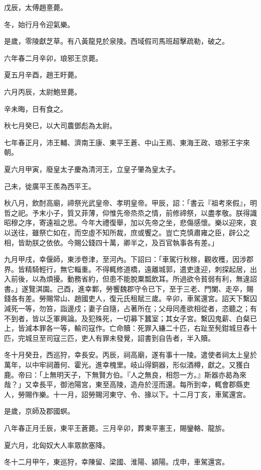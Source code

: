\begin{pinyinscope}
戊辰，太傅趙憙薨。

冬，始行月令迎氣樂。

是歲，零陵獻芝草。有八黃龍見於泉陵。西域假司馬班超擊疏勒，破之。

六年春二月辛卯，琅邪王京薨。

夏五月辛酉，趙王盱薨。

六月丙辰，太尉鮑昱薨。

辛未晦，日有食之。

秋七月癸巳，以大司農鄧彪為太尉。

七年春正月，沛王輔、濟南王康、東平王蒼、中山王焉、東海王政、琅邪王宇來朝。

夏六月甲寅，廢皇太子慶為清河王，立皇子肇為皇太子。

己未，徙廣平王羨為西平王。

秋八月，飲酎高廟，禘祭光武皇帝、孝明皇帝。甲辰，詔：「書云『祖考來假』，明哲之祀。予末小子，質又菲薄，仰惟先帝烝烝之情，前修禘祭，以盡孝敬。朕得識昭穆之序，寄遠祖之思。今年大禮復舉，加以先帝之坐，悲傷感懷。樂以迎來，哀以送往，雖祭亡如在，而空虛不知所裁，庶或饗之。豈亡克慎肅雍之臣，辟公之相，皆助朕之依依。今賜公錢四十萬，卿半之，及百官執事各有差。」

九月甲戌，幸偃師，東涉卷津，至河內。下詔曰：「車駕行秋稼，觀收穫，因涉郡界。皆精騎輕行，無它輜重。不得輒修道橋，遠離城郭，遣吏逢迎，刺探起居，出入前後，以為煩擾。動務省約，但患不能脫粟瓢飲耳。所過欲令貧弱有利，無違詔書。」遂覽淇園。己酉，進幸鄴，勞饗魏郡守令已下，至于三老、門闌、走卒，賜錢各有差。勞賜常山、趙國吏人，復元氏租賦三歲。辛卯，車駕還宮。詔天下繫囚減死一等，勿笞，詣邊戍；妻子自隨，占著所在；父母同產欲相從者，恣聽之；有不到者，皆以乏軍興論。及犯殊死，一切募下蠶室；其女子宮。繫囚鬼薪、白粲已上，皆減本罪各一等，輸司寇作。亡命贖：死罪入縑二十匹，右趾至髡鉗城旦舂十匹，完城旦至司寇三匹，吏人有罪未發覺，詔書到自告者，半入贖。

冬十月癸丑，西巡狩，幸長安。丙辰，祠高廟，遂有事十一陵。遣使者祠太上皇於萬年，以中牢祠蕭何、霍光。進幸槐里。岐山得銅器，形似酒樽，獻之。又獲白鹿。帝曰：「上無明天子，下無賢方伯。『人之無良，相怨一方。』斯器亦曷為來哉？」又幸長平，御池陽宮，東至高陵，造舟於涇而還。每所到幸，輒會郡縣吏人，勞賜作樂。十一月，詔勞賜河東守、令、掾以下。十二月丁亥，車駕還宮。

是歲，京師及郡國螟。

八年春正月壬辰，東平王蒼薨。三月辛卯，葬東平憲王，賜鑾輅、龍旂。

夏六月，北匈奴大人率眾款塞降。

冬十二月甲午，東巡狩，幸陳留、梁國、淮陽、潁陽。戊申，車駕還宮。


\end{pinyinscope}

